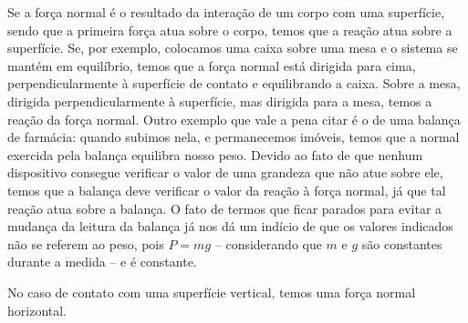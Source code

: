 Se a força normal é o resultado da interação de um corpo com uma superfície, sendo que a primeira força atua sobre o corpo, temos que a reação atua sobre a superfície. Se, por exemplo, colocamos uma caixa sobre uma mesa e o sistema se mantém em equilíbrio, temos que a força normal está dirigida para cima, perpendicularmente à superfície de contato e equilibrando a caixa. Sobre a mesa, dirigida perpendicularmente à superfície, mas dirigida para a mesa, temos a reação da força normal. Outro exemplo que vale a pena citar é o de uma balança de farmácia: quando subimos nela, e permanecemos imóveis, temos que a normal exercida pela balança equilibra nosso peso.  Devido ao fato de que nenhum dispositivo consegue verificar o valor de uma grandeza que não atue sobre ele, temos que a balança deve verificar o valor da reação à força normal, já que tal reação atua sobre a balança. O fato de termos que ficar parados para evitar a mudança da leitura da balança já nos dá um indício de que os valores indicados não se referem ao peso, pois $P = mg$ -- considerando que $m$ e $g$ são constantes durante a medida -- e é constante.

\begin{marginfigure}
\centering
{}
\caption{No caso de contato com uma superfície vertical, temos uma força normal horizontal.}
\end{marginfigure}

